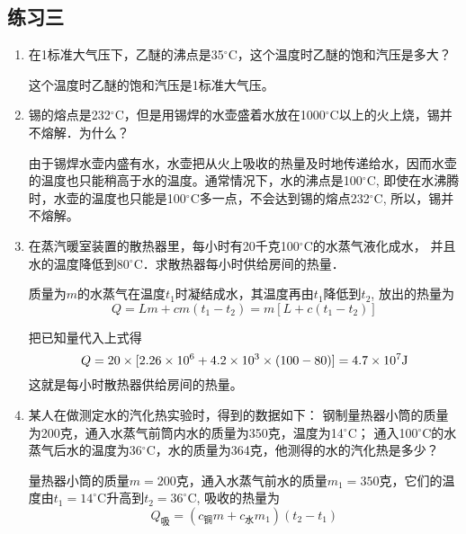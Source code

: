 \subsection{练习三}
\begin{enumerate}
 \item 在1标准大气压下，乙醚的沸点是35$^\circ$C，这个温度时乙醚的饱和汽压是多大？
    
 \begin{solution}
这个温度时乙醚的饱和汽压是1标准大气压。
 \end{solution}
  \item 锡的熔点是232$^\circ$C，但是用锡焊的水壶盛着水放在1000$^\circ$C以上的火上烧，锡并不熔解．为什么？
    
  \begin{solution}
    由于锡焊水壶内盛有水，水壶把从火上吸收的热量及时地传递给水，因而水壶的温度也只能稍高于水的温度。通常情况下，水的沸点是100$^\circ$C, 即使在水沸腾时，水壶的温度也只能是100$^\circ$C多一点，不会达到锡的熔点232$^\circ$C, 所以，锡并不熔解。
  \end{solution}
  \item 在蒸汽暖室装置的散热器里，每小时有20千克100$^\circ$C的水蒸气液化成水，
    并且水的温度降低到80$^\circ$C．求散热器每小时供给房间的热量．
    
    \begin{solution}
质量为$m$的水蒸气在温度$t_1$时凝结成水，其温度再由$t_1$降低到$t_2$, 放出的热量为
\[Q=Lm+cm (t_1-t_2) =m [L+c (t_1-t_2) ]\]

把已知量代入上式得
\[Q=20\times[2. 26\times10^6+4.2\times10^3\times(100-80)]
=4.7\times10^7{\rm J}\]
这就是每小时散热器供给房间的热量。 
    \end{solution}
    \item 某人在做测定水的汽化热实验时，得到的数据如下：
   钢制量热器小筒的质量为200克，通入水蒸气前筒内水的质量为350克，温度为14$^\circ$C；
    通入100$^\circ$C的水蒸气后水的温度为36$^\circ$C，水的质量为364克，他测得的水的汽化热是多少？
    
    \begin{solution}
量热器小筒的质量$m=200$克，通入水蒸气前水的质量$m_1=350$克，它们的温度由$t_1=14^{\circ}$C升高到$t_2=36^{\circ}$C, 吸收的热量为
\[Q_{\text{吸}}= (c_{\text{铜}}m+c_{\text{水}}m_1) (t_2-t_1)\]


\end{solution}
\end{enumerate}
